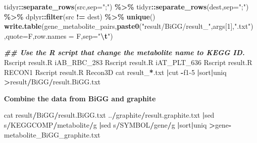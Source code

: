 \documentclass[
]{book}
\newenvironment{Shaded}{\begin{snugshade}}{\end{snugshade}}
\newcommand{\AttributeTok}[1]{\textcolor[rgb]{0.13,0.29,0.53}{#1}}
\newcommand{\DecValTok}[1]{\textcolor[rgb]{0.00,0.00,0.81}{#1}}
\newcommand{\DocumentationTok}[1]{\textcolor[rgb]{0.56,0.35,0.01}{\textbf{\textit{#1}}}}
\newcommand{\FunctionTok}[1]{\textcolor[rgb]{0.13,0.29,0.53}{\textbf{#1}}}
\newcommand{\NormalTok}[1]{#1}
\newcommand{\SpecialCharTok}[1]{\textcolor[rgb]{0.81,0.36,0.00}{\textbf{#1}}}
\newcommand{\StringTok}[1]{\textcolor[rgb]{0.31,0.60,0.02}{#1}}
\begin{document}
\begin{Shaded}
\begin{Highlighting}[]
\NormalTok{  tidyr}\SpecialCharTok{::}\FunctionTok{separate\_rows}\NormalTok{(src,}\AttributeTok{sep=}\StringTok{";"}\NormalTok{) }\SpecialCharTok{\%\textgreater{}\%}
\NormalTok{  tidyr}\SpecialCharTok{::}\FunctionTok{separate\_rows}\NormalTok{(dest,}\AttributeTok{sep=}\StringTok{";"}\NormalTok{) }\SpecialCharTok{\%\textgreater{}\%}
\NormalTok{  dplyr}\SpecialCharTok{::}\FunctionTok{filter}\NormalTok{(src }\SpecialCharTok{!=}\NormalTok{ dest) }\SpecialCharTok{\%\textgreater{}\%}
  \FunctionTok{unique}\NormalTok{()}
\FunctionTok{write.table}\NormalTok{(gene\_metabolite\_pairs,}\FunctionTok{paste0}\NormalTok{(}\StringTok{"result/BiGG/result\_"}\NormalTok{,args[}\DecValTok{1}\NormalTok{],}\StringTok{".txt"}\NormalTok{),}\AttributeTok{quote=}\NormalTok{F,}\AttributeTok{row.names =}\NormalTok{ F,}\AttributeTok{sep=}\StringTok{"}\SpecialCharTok{\textbackslash{}t}\StringTok{"}\NormalTok{)}

\DocumentationTok{\#\# Use the R script that change the metabolite name to KEGG ID.}
\NormalTok{Rscript result.R iAB\_RBC\_283}
\NormalTok{Rscript result.R iAT\_PLT\_636}
\NormalTok{Rscript result.R RECON1}
\NormalTok{Rscript result.R Recon3D}
\NormalTok{cat result\_}\SpecialCharTok{*}\NormalTok{.txt }\SpecialCharTok{|}\NormalTok{cut }\SpecialCharTok{{-}}\NormalTok{f1}\DecValTok{{-}5} \SpecialCharTok{|}\NormalTok{sort}\SpecialCharTok{|}\NormalTok{uniq }\SpecialCharTok{\textgreater{}}\NormalTok{result}\SpecialCharTok{/}\NormalTok{BiGG}\SpecialCharTok{/}\NormalTok{result.BiGG.txt}
\end{Highlighting}
\end{Shaded}

\textbf{Combine the data from BiGG and graphite}

\begin{Shaded}
\begin{Highlighting}[]
\NormalTok{ cat result}\SpecialCharTok{/}\NormalTok{BiGG}\SpecialCharTok{/}\NormalTok{result.BiGG.txt ..}\SpecialCharTok{/}\NormalTok{graphite}\SpecialCharTok{/}\NormalTok{result.graphite.txt }\SpecialCharTok{|}\NormalTok{sed s}\SpecialCharTok{/}\NormalTok{KEGGCOMP}\SpecialCharTok{/}\NormalTok{metabolite}\SpecialCharTok{/}\NormalTok{g }\SpecialCharTok{|}\NormalTok{sed s}\SpecialCharTok{/}\NormalTok{SYMBOL}\SpecialCharTok{/}\NormalTok{gene}\SpecialCharTok{/}\NormalTok{g }\SpecialCharTok{|}\NormalTok{sort}\SpecialCharTok{|}\NormalTok{uniq }\SpecialCharTok{\textgreater{}}\NormalTok{gene}\SpecialCharTok{{-}}\NormalTok{metabolite\_BiGG\_graphite.txt}
\end{Highlighting}
\end{Shaded}
\end{document}
